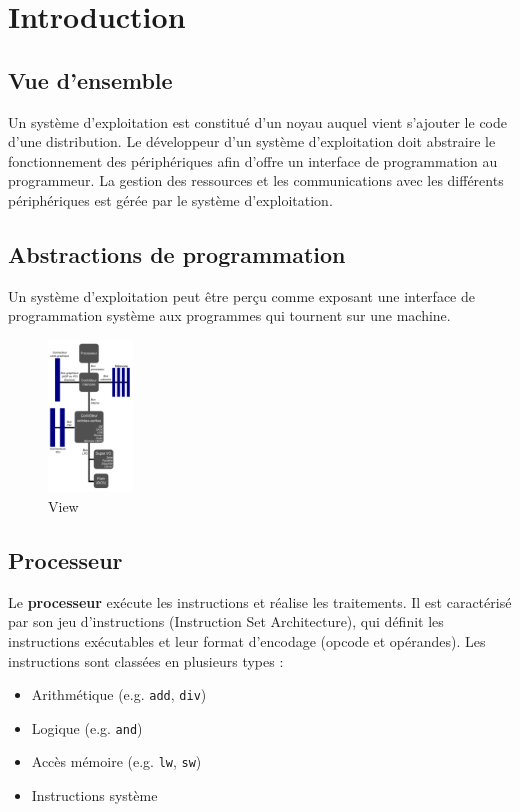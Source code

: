 \section{Introduction}\label{sec:introduction}
\subsection{Vue d'ensemble}

Un système d'exploitation est constitué d'un noyau auquel vient s'ajouter le code d'une distribution.
Le développeur d'un système d'exploitation doit abstraire le fonctionnement des périphériques afin d'offre un interface de programmation au programmeur.
La gestion des ressources et les communications avec les différents périphériques est gérée par le système d'exploitation.

\subsection{Abstractions de programmation}

Un système d’exploitation peut être perçu comme exposant une interface de programmation système aux programmes qui tournent sur une machine.

\begin{figure}[h!]
    \centering
    \includegraphics[width=0.2\textwidth]{Images/View/view.png}
    \caption{View}
    \label{fig:myimage}
  \end{figure}
  

\subsection{Processeur}


Le \textbf{processeur} exécute les instructions et réalise les traitements. Il est caractérisé par son jeu d'instructions (Instruction Set Architecture), qui définit les instructions exécutables et leur format d'encodage (opcode et opérandes). Les instructions sont classées en plusieurs types :
\begin{itemize}
    \item Arithmétique (e.g. \texttt{add}, \texttt{div})
    \item Logique (e.g. \texttt{and})
    \item Accès mémoire (e.g. \texttt{lw}, \texttt{sw})
    \item Instructions système
\end{itemize}

